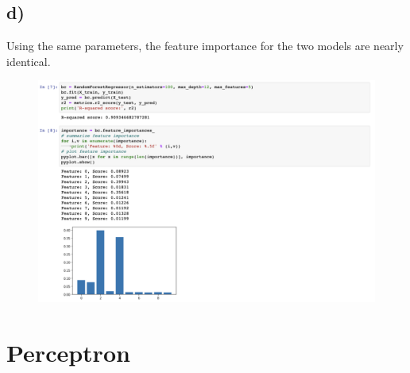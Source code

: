 \documentclass[12pt, letterpaper]{article}
\begin{document}
\subsection*{d)} Using the same parameters, the feature importance for the two models are nearly identical.
\begin{figure}[h!]
  \includegraphics[scale=0.4]{./images/4d}
\end{figure}
\clearpage

\newpage
\section{Perceptron}
\end{document}
